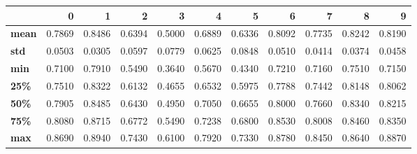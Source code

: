 \begin{tabular}{lrrrrrrrrrr}
\toprule
{} &       0 &       1 &       2 &       3 &       4 &       5 &       6 &       7 &       8 &       9 \\
\midrule
\textbf{mean} &  0.7869 &  0.8486 &  0.6394 &  0.5000 &  0.6889 &  0.6336 &  0.8092 &  0.7735 &  0.8242 &  0.8190 \\
\textbf{std } &  0.0503 &  0.0305 &  0.0597 &  0.0779 &  0.0625 &  0.0848 &  0.0510 &  0.0414 &  0.0374 &  0.0458 \\
\textbf{min } &  0.7100 &  0.7910 &  0.5490 &  0.3640 &  0.5670 &  0.4340 &  0.7210 &  0.7160 &  0.7510 &  0.7150 \\
\textbf{25\% } &  0.7510 &  0.8322 &  0.6132 &  0.4655 &  0.6532 &  0.5975 &  0.7788 &  0.7442 &  0.8148 &  0.8062 \\
\textbf{50\% } &  0.7905 &  0.8485 &  0.6430 &  0.4950 &  0.7050 &  0.6655 &  0.8000 &  0.7660 &  0.8340 &  0.8215 \\
\textbf{75\% } &  0.8080 &  0.8715 &  0.6772 &  0.5490 &  0.7238 &  0.6800 &  0.8530 &  0.8008 &  0.8460 &  0.8350 \\
\textbf{max } &  0.8690 &  0.8940 &  0.7430 &  0.6100 &  0.7920 &  0.7330 &  0.8780 &  0.8450 &  0.8640 &  0.8870 \\
\bottomrule
\end{tabular}
